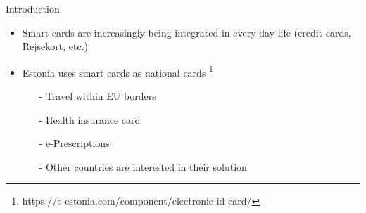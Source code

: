 


\begin{frame}[fragile]{Introduction}
\begin{center}
	\begin{itemize}
	\item Smart cards are increasingly being integrated in every day life (credit cards, Rejsekort, etc.)
	\item Estonia uses smart cards as national cards \footnote{https://e-estonia.com/component/electronic-id-card/}
		\begin{itemize}
		\item[-] Travel within EU borders
		\item[-] Health insurance card
		\item[-] e-Prescriptions
		\item[-] Other countries are interested in their solution
		\end{itemize}
	\end{itemize}
\end{center}
\end{frame}

